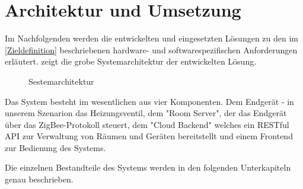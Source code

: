 \section{Architektur und Umsetzung}

Im Nachfolgenden werden die entwickelten und eingesetzten Lösungen zu den im \autoref{Zieldefinition} beschriebenen hardware- und softwarespezifischen Anforderungen erläutert.  zeigt
die grobe Systemarchitektur der entwickelten Lösung.


\begin{figure}[htb]
\centering
{}
\caption{Sestemarchitektur}
\label{fig:DD}
\end{figure}

Das System besteht im wesentlichen aus vier Komponenten. Dem Endgerät - in unserem Szenarion das Heizungsventil, dem "Room Server", der das Endgerät über das ZigBee-Protokoll steuert, dem "Cloud Backend" welches ein RESTful API zur Verwaltung von Räumen und Geräten bereitstellt und einem Frontend zur Bedienung des Systems.

Die einzelnen Bestandteile des Systems werden in den folgenden Unterkapiteln genau beschrieben. 



